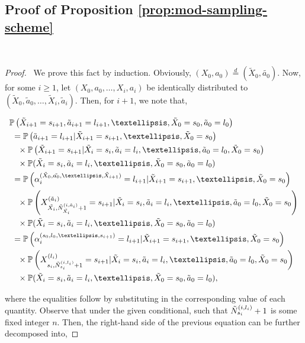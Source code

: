 \documentclass[opre,sglanonrev]{informs4}
\numberwithin{equation}{section}
\newcommand{\pow}[1]{^{(#1)}}
\newcommand{\lp}{\left(}
\newcommand{\rp}{\right)}
\newcommand{\Pbb}{\mathbb{P}}
\newcommand{\prob}{\Pbb}
\begin{document}
\begin{APPENDICES}
\subsection{Proof of Proposition \ref{prop:mod-sampling-scheme}}~\label{prf:sampling-scheme}
\begin{proof}\ 
We prove this fact by induction. 
Obviously, $(X_0,a_0)\overset{d}{=}(\tilde X_0,\tilde{a_0})$.
Now, for some $i\geq 1$, let $\lp X_0,a_0,\dots,X_i,a_i\rp$ be identically distributed to $\lp \tilde X_0,\tilde a_0,\dots,\tilde X_i,\tilde a_i\rp$. Then, for $i+1$, we note that,
\begin{small}
\begin{align*}
    & \prob\lp \tilde X_{i+1}=s_{i+1},\tilde a_{i+1}=l_{i+1},\dots,\tilde X_0=s_0,\tilde a_0=l_0 \rp\\
    & \ =\prob\lp \tilde a_{i+1}=l_{i+1}| \tilde X_{i+1}=s_{i+1},\dots,\tilde X_0=s_0\rp\\ 
    &\quad \times\prob\lp \tilde X_{i+1}=s_{i+1}|\tilde X_i=s_i,\tilde a_{i}=l_i,\dots,\tilde a_0=l_0,\tilde X_0=s_0\rp\\
    &\quad \times \prob(\tilde X_i=s_i,\tilde a_i=l_i,\dots,\tilde X_0=s_0,\tilde a_0=l_0)\\
    & \ =\prob\lp  \alpha_i\pow{\tilde X_0,\tilde{a_0},\dots,\tilde X_{i+1}}=l_{i+1}| \tilde X_{i+1}=s_{i+1},\dots,\tilde X_0=s_0\rp\\
    &\quad \times \prob\lp X_{\Tilde{X_i},\Tilde{N}_{\Tilde{X_i}}^{(i,\tilde a_i)}+1}\pow{\tilde a_i}=s_{i+1}|\tilde X_i=s_i,\tilde a_{i}=l_i,\dots,\tilde a_0=l_0,\tilde X_0=s_0\rp\\
    &\quad \times \prob(\tilde X_i=s_i,\tilde a_i=l_i,\dots,\tilde X_0=s_0,\tilde a_0=l_0)\\
    & \ =\prob\lp  \alpha_i\pow{s_0,l_0,\dots,s_{i+1}}=l_{i+1}| \tilde X_{i+1}=s_{i+1},\dots,\tilde X_0=s_0\rp\\
    &\quad \times \prob\lp X_{s_i,\Tilde{N}_{s_i}^{(i,l_i)}+1}\pow{l_i}=s_{i+1}|\tilde X_i=s_i,\tilde a_{i}=l_i,\dots,\tilde a_0=l_0,\tilde X_0=s_0\rp\\
    &\quad \times \prob(\tilde X_i=s_i,\tilde a_i=l_i,\dots,\tilde X_0=s_0,\tilde a_0=l_0),
\end{align*}
\end{small}
where the equalities follow by substituting in the corresponding value of each quantity. Observe that under the given conditional, such that $\Tilde{N}_{s_i}^{(i,l_i)}+1$ is some fixed integer $n$. 
Then, the right-hand side of the previous equation can be further decomposed into,

\end{proof}
\end{APPENDICES}
\end{document}
